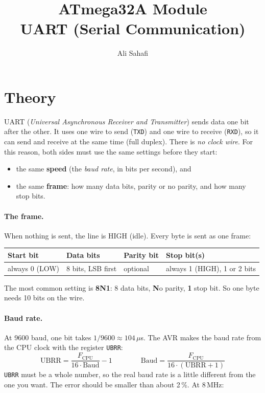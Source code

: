 \documentclass[11pt,a4paper]{article}
\title{ATmega32A Module \\ \Large UART (Serial Communication)}
\author{Ali Sahafi}
\date{}
\newcommand{\code}[1]{\texttt{#1}}
\begin{document}
\maketitle

\section{Theory}

UART (\emph{Universal Asynchronous Receiver and Transmitter}) sends data one
bit after the other. It uses one wire to send (\code{TXD}) and one wire to
receive (\code{RXD}), so it can send and receive at the same time (full
duplex). There is \emph{no clock wire}. For this reason, both sides must
use the same settings before they start:

\begin{itemize}
  \item the same \textbf{speed} (the \emph{baud rate}, in bits per second), and
  \item the same \textbf{frame}: how many data bits, parity or no parity, and
        how many stop bits.
\end{itemize}

\paragraph{The frame.} When nothing is sent, the line is HIGH (idle). Every
byte is sent as one frame:

\begin{center}
\begin{tabular}{llll}
\toprule
\textbf{Start bit} & \textbf{Data bits} & \textbf{Parity bit} & \textbf{Stop bit(s)} \\
\midrule
always 0 (LOW) & 8 bits, LSB first & optional & always 1 (HIGH), 1 or 2 bits \\
\bottomrule
\end{tabular}
\end{center}

The most common setting is \textbf{8N1}: 8 data bits, \textbf{N}o parity,
\textbf{1} stop bit. So one byte needs 10 bits on the wire.

\paragraph{Baud rate.} At 9600 baud, one bit takes $1/9600 \approx 104\,\mu$s.
The AVR makes the baud rate from the CPU clock with the register \code{UBRR}:
\[ \text{UBRR} = \frac{F_{\text{CPU}}}{16 \cdot \text{Baud}} - 1 \qquad\qquad
   \text{Baud} = \frac{F_{\text{CPU}}}{16 \cdot (\text{UBRR} + 1)} \]
\code{UBRR} must be a whole number, so the real baud rate is a little
different from the one you want. The error should be smaller than about 2\,\%.
At 8\,MHz:
\end{document}
